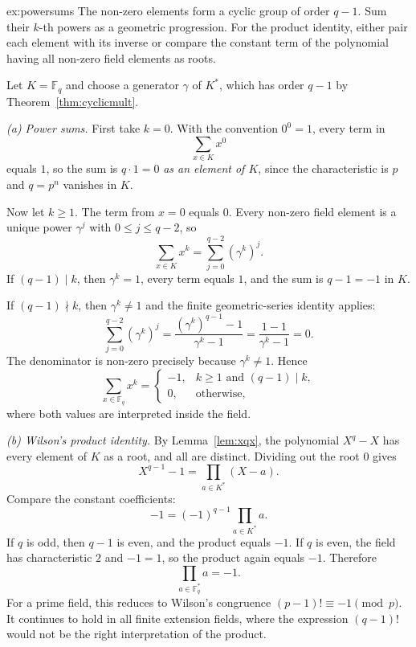 \begin{solution}{ex:powersums}
\idea The non-zero elements form a cyclic group of order $q-1$. Sum their $k$-th powers as a geometric progression. For the product identity, either pair each element with its inverse or compare the constant term of the polynomial having all non-zero field elements as roots.

\writeup Let $K=\mathbb F_q$ and choose a generator $\gamma$ of $K^*$, which has order $q-1$ by Theorem~\ref{thm:cyclicmult}.

\emph{(a) Power sums.} First take $k=0$. With the convention $0^0=1$, every term in
\[
\sum_{x\in K}x^0
\]
equals $1$, so the sum is $q\cdot1=0$ \emph{as an element of $K$}, since the characteristic is $p$ and $q=p^n$ vanishes in $K$.

Now let $k\ge1$. The term from $x=0$ equals $0$. Every non-zero field element is a unique power $\gamma^j$ with $0\le j\le q-2$, so
\[
\sum_{x\in K}x^k
=\sum_{j=0}^{q-2}(\gamma^k)^j.
\]
If $(q-1)\mid k$, then $\gamma^k=1$, every term equals $1$, and the sum is $q-1=-1$ in $K$.

If $(q-1)\nmid k$, then $\gamma^k\ne1$ and the finite geometric-series identity applies:
\[
\sum_{j=0}^{q-2}(\gamma^k)^j
=\frac{(\gamma^k)^{q-1}-1}{\gamma^k-1}
=\frac{1-1}{\gamma^k-1}=0.
\]
The denominator is non-zero precisely because $\gamma^k\ne1$. Hence
\[
\boxed{\sum_{x\in\mathbb F_q}x^k=
\begin{cases}
-1,&k\ge1\text{ and }(q-1)\mid k,\\
0,&\text{otherwise},
\end{cases}}
\]
where both values are interpreted inside the field.

\emph{(b) Wilson's product identity.} By Lemma~\ref{lem:xqx}, the polynomial $X^q-X$ has every element of $K$ as a root, and all are distinct. Dividing out the root $0$ gives
\[
X^{q-1}-1=\prod_{a\in K^*}(X-a).
\]
Compare the constant coefficients:
\[
-1=(-1)^{q-1}\prod_{a\in K^*}a.
\]
If $q$ is odd, then $q-1$ is even, and the product equals $-1$. If $q$ is even, the field has characteristic $2$ and $-1=1$, so the product again equals $-1$. Therefore
\[
\boxed{\prod_{a\in\mathbb F_q^*}a=-1}.
\]
For a prime field, this reduces to Wilson's congruence $(p-1)!\equiv-1\pmod p$. It continues to hold in all finite extension fields, where the expression $(q-1)!$ would not be the right interpretation of the product.
\end{solution}

